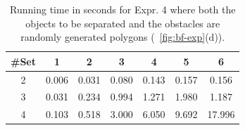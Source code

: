 \begin{table}[ht]
    \centering
    \begin{tabular}{|c|c|c|c|c|c|c|}\hline
         \#Set&  1 & 2 & 3 & 4& 5& 6\\\hline
2& 0.006 & 0.031 & 0.080 & 0.143 & 0.157 & 0.156 \\\hline
3& 0.031 & 0.234 & 0.994 & 1.271 & 1.980 & 1.187 \\\hline
4& 0.103 & 0.518 & 3.000 & 6.050 & 9.692 & 17.996 \\\hline 
    \end{tabular}
    \caption[Running time in seconds for Expr. 4]{Running time in seconds for Expr. 4 where both the objects to be separated and the obstacles are randomly generated polygons 
    (~\ref{fig:bf-exp}(d)).
    }
    \label{tab:bf-expr_4}
    \vspace{-2mm}
\end{table}